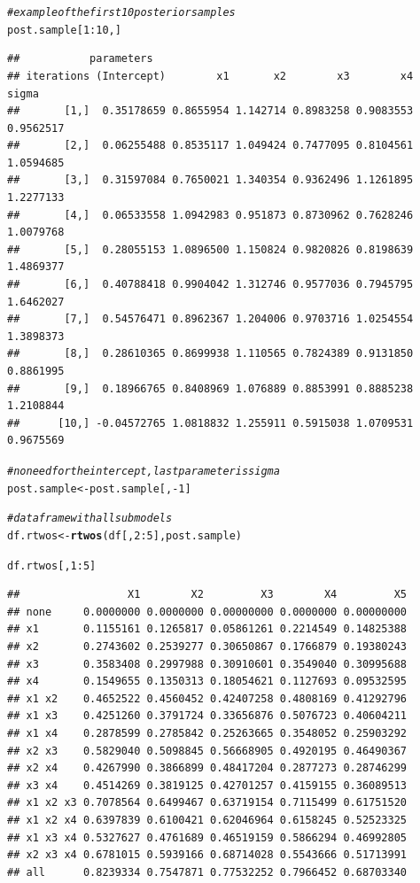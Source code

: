 \documentclass[11pt,a4paper,twoside]{book}\usepackage[]{graphicx}\usepackage[]{color}
\makeatletter
\newcommand{\hlnum}[1]{\textcolor[rgb]{0.686,0.059,0.569}{#1}}%
\newcommand{\hlcom}[1]{\textcolor[rgb]{0.678,0.584,0.686}{\textit{#1}}}%
\newcommand{\hlopt}[1]{\textcolor[rgb]{0,0,0}{#1}}%
\newcommand{\hlstd}[1]{\textcolor[rgb]{0.345,0.345,0.345}{#1}}%
\newcommand{\hlkwb}[1]{\textcolor[rgb]{0.69,0.353,0.396}{#1}}%
\newcommand{\hlkwd}[1]{\textcolor[rgb]{0.737,0.353,0.396}{\textbf{#1}}}%
\newenvironment{kframe}{%
 \def\at@end@of@kframe{}%
 \ifinner\ifhmode%
  \def\at@end@of@kframe{\end{minipage}}%
  \begin{minipage}{\columnwidth}%
 \fi\fi%
 \def\FrameCommand##1{\hskip\@totalleftmargin \hskip-\fboxsep
 \colorbox{shadecolor}{##1}\hskip-\fboxsep
     \hskip-\linewidth \hskip-\@totalleftmargin \hskip\columnwidth}%
 \MakeFramed {\advance\hsize-\width
   \@totalleftmargin\z@ \linewidth\hsize
   \@setminipage}}%
 {\par\unskip\endMakeFramed%
 \at@end@of@kframe}
\newenvironment{knitrout}{}{} %
\makeatother
\begin{document}
\begin{knitrout}
\begin{kframe}
\begin{alltt}
\hlcom{#example of the first 10 posterior samples}
\hlstd{post.sample[}\hlnum{1}\hlopt{:}\hlnum{10}\hlstd{,]}
\end{alltt}
\begin{verbatim}
##           parameters
## iterations (Intercept)        x1       x2        x3        x4     sigma
##       [1,]  0.35178659 0.8655954 1.142714 0.8983258 0.9083553 0.9562517
##       [2,]  0.06255488 0.8535117 1.049424 0.7477095 0.8104561 1.0594685
##       [3,]  0.31597084 0.7650021 1.340354 0.9362496 1.1261895 1.2277133
##       [4,]  0.06533558 1.0942983 0.951873 0.8730962 0.7628246 1.0079768
##       [5,]  0.28055153 1.0896500 1.150824 0.9820826 0.8198639 1.4869377
##       [6,]  0.40788418 0.9904042 1.312746 0.9577036 0.7945795 1.6462027
##       [7,]  0.54576471 0.8962367 1.204006 0.9703716 1.0254554 1.3898373
##       [8,]  0.28610365 0.8699938 1.110565 0.7824389 0.9131850 0.8861995
##       [9,]  0.18966765 0.8408969 1.076889 0.8853991 0.8885238 1.2108844
##      [10,] -0.04572765 1.0818832 1.255911 0.5915038 1.0709531 0.9675569
\end{verbatim}
\begin{alltt}
\hlcom{#no need for the intercept, last parameter is sigma}
\hlstd{post.sample} \hlkwb{<-} \hlstd{post.sample[,}\hlopt{-}\hlnum{1}\hlstd{]}


\hlcom{#data frame with all submodels}
\hlstd{df.rtwos} \hlkwb{<-}\hlkwd{rtwos}\hlstd{(df[,}\hlnum{2}\hlopt{:}\hlnum{5}\hlstd{], post.sample)}

\hlstd{df.rtwos[,}\hlnum{1}\hlopt{:}\hlnum{5}\hlstd{]}
\end{alltt}
\begin{verbatim}
##                 X1        X2         X3        X4         X5
## none     0.0000000 0.0000000 0.00000000 0.0000000 0.00000000
## x1       0.1155161 0.1265817 0.05861261 0.2214549 0.14825388
## x2       0.2743602 0.2539277 0.30650867 0.1766879 0.19380243
## x3       0.3583408 0.2997988 0.30910601 0.3549040 0.30995688
## x4       0.1549655 0.1350313 0.18054621 0.1127693 0.09532595
## x1 x2    0.4652522 0.4560452 0.42407258 0.4808169 0.41292796
## x1 x3    0.4251260 0.3791724 0.33656876 0.5076723 0.40604211
## x1 x4    0.2878599 0.2785842 0.25263665 0.3548052 0.25903292
## x2 x3    0.5829040 0.5098845 0.56668905 0.4920195 0.46490367
## x2 x4    0.4267990 0.3866899 0.48417204 0.2877273 0.28746299
## x3 x4    0.4514269 0.3819125 0.42701257 0.4159155 0.36089513
## x1 x2 x3 0.7078564 0.6499467 0.63719154 0.7115499 0.61751520
## x1 x2 x4 0.6397839 0.6100421 0.62046964 0.6158245 0.52523325
## x1 x3 x4 0.5327627 0.4761689 0.46519159 0.5866294 0.46992805
## x2 x3 x4 0.6781015 0.5939166 0.68714028 0.5543666 0.51713991
## all      0.8239334 0.7547871 0.77532252 0.7966452 0.68703340
\end{verbatim}
\end{kframe}
\end{knitrout}
\end{document}
